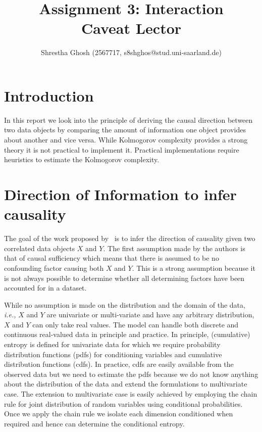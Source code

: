 \documentclass[10pt]{article}
\title{Assignment 3: Interaction\\
      Caveat Lector}
\author{Shrestha Ghosh (2567717, s8shghos@stud.uni-saarland.de)}
\begin{document}
\maketitle
\section{Introduction}
In this report we look into the principle of deriving the causal direction between two data objects by comparing the amount of information one object provides about another and vice versa. While Kolmogorov complexity provides a strong theory it is not practical to implement it. Practical implementations require heuristics to estimate the Kolmogorov complexity. 

\section{Direction of Information to infer causality}
\par The goal of the work proposed by~\citet{vreeken2015causal} is to infer the direction of causality given two correlated data objects $X$ and $Y$. The first assumption made by the authors is that of causal sufficiency which means that there is assumed to be no confounding factor causing both $X$ and $Y$. This is a strong assumption because it is not always possible to determine whether all determining factors have been accounted for in a dataset.  

\par While no assumption is made on the distribution and the domain of the data, \emph{i.e.,} $X$ and $Y$ are univariate or multi-variate and have any arbitrary distribution, $X$ and $Y$ can only take real values. The model can handle both discrete and continuous real-valued data in principle and practice. In principle, (cumulative) entropy is defined for univariate data for which we require probability distribution functions (pdfs) for conditioning variables and cumulative distribution functions (cdfs). In practice, cdfs are easily available from the observed data but we need to estimate the pdfs because we do not know anything about the distribution of the data and extend the formulations to multivariate case. The extension to multivariate case is easily achieved by employing the chain rule for joint distribution of random variables using conditional probabilities. Once we apply the chain rule we isolate each dimension conditioned when required and hence can determine the conditional entropy.
\end{document}
